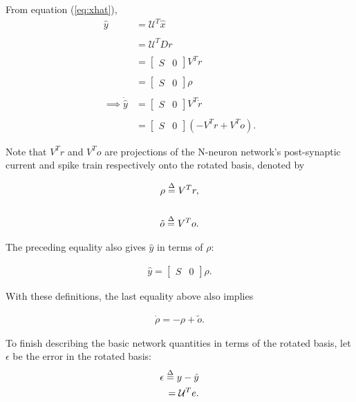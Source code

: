 \begin{enumerate}
From equation (\ref{eq:xhat}),
\begin{align*}
\hat{y} &= \mathcal{U}^T \hat{x}
\\ 
\\ 
&=
\mathcal{U}^T D r
\\ 
\\ 
&= 
\begin{bmatrix}
S & 0
\end{bmatrix}
V^T
r
\\
\\
&=
\begin{bmatrix}
S & 0
\end{bmatrix}
\rho
\\
\\
\implies
\dot{\hat{y}}
&= 
\begin{bmatrix}
S & 0
\end{bmatrix}
V^T
\dot{r}
\\
\\
&= 
\begin{bmatrix}
S & 0
\end{bmatrix}
\left( 
-V^T r + V^T o
\right).
\end{align*}

Note that $V^T r$ and $V^T o $ are projections of the N-neuron network's post-synaptic current and spike train respectively onto the rotated basis, denoted by 

\begin{align}
\rho \overset{\Delta}{=} V^T r, 
\label{eq:def_rho}
\\ \notag
\\
\tilde{o} \overset{\Delta}{=} V^T o
\label{eq:def_o_tilde}.
\end{align}

The preceding equality also gives $\hat{y}$ in terms of $\rho$:

\begin{align}
\label{eq:basic:def:y_hat}
\hat{y} = 
\begin{bmatrix}
S & 0
\end{bmatrix}
\rho.
\end{align}

With these definitions, the last equality above also implies

\begin{align}
\label{eq:rho_dot}
\dot{\rho} = -\rho + \tilde{o}.
\end{align}

To finish describing the basic network quantities in terms of the rotated basis, let $\epsilon$ be the error in the rotated basis:
\begin{align}
\label{eq:rotated_error_def}
\epsilon \overset{\Delta}{=} y - \hat{y} \\= \mathcal{U}^T e. \notag
\end{align}


\end{enumerate}
